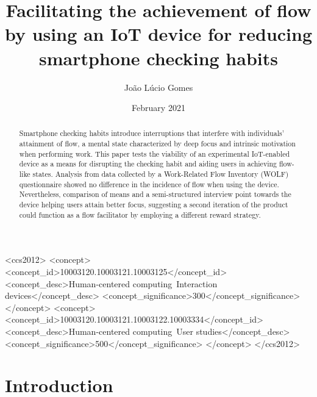 \documentclass[format=acmsmall]{acmart}
\begin{document}
\title{Facilitating the achievement of flow by using an IoT device for reducing smartphone checking habits}
\author{João Lúcio Gomes}
\date{February 2021}

\begin{abstract}
Smartphone checking habits introduce interruptions that interfere with individuals' attainment of flow, a mental state characterized by deep focus and intrinsic motivation when performing work. This paper tests the viability of an experimental IoT-enabled device as a means for disrupting the checking habit and aiding users in achieving flow-like states. Analysis from data collected by a Work-Related Flow Inventory (WOLF) questionnaire showed no difference in the incidence of flow when using the device. Nevertheless, comparison of means and a semi-structured interview point towards the device helping users attain better focus, suggesting a second iteration of the product could function as a flow facilitator by employing a different reward strategy.
\end{abstract}

\begin{CCSXML}
<ccs2012>
   <concept>
       <concept_id>10003120.10003121.10003125</concept_id>
       <concept_desc>Human-centered computing~Interaction devices</concept_desc>
       <concept_significance>300</concept_significance>
       </concept>
   <concept>
       <concept_id>10003120.10003121.10003122.10003334</concept_id>
       <concept_desc>Human-centered computing~User studies</concept_desc>
       <concept_significance>500</concept_significance>
       </concept>
 </ccs2012>
\end{CCSXML}


\maketitle
 
\section{Introduction}
\end{document}

